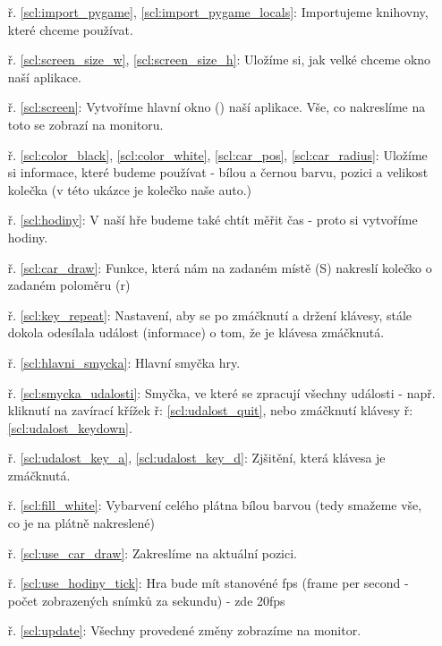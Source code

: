 \begin{minipage}[t]{.45\textwidth}
\begin{enumerate}
\item[ř. \ref{scl:import_pygame}, \ref{scl:import_pygame_locals}:] Importujeme knihovny, které chceme používat.
\item[ř. \ref{scl:screen_size_w}, \ref{scl:screen_size_h}:] Uložíme si, jak velké chceme okno naší aplikace.
\vspace{1.5cm}
\item[ř. \ref{scl:screen}:] Vytvoříme hlavní okno () naší aplikace. Vše, co nakreslíme na toto  se zobrazí na monitoru.
\item[ř. \ref{scl:color_black}, \ref{scl:color_white}, \ref{scl:car_pos}, \ref{scl:car_radius}:] Uložíme si informace, které budeme používat - bílou a černou barvu, pozici a velikost kolečka (v této ukázce je kolečko naše auto.)
\item[ř. \ref{scl:hodiny}:] V naší hře budeme také chtít měřit čas - proto si vytvoříme hodiny.
\vspace{1.8cm}
\item[ř. \ref{scl:car_draw}:] Funkce, která nám na zadaném místě (S) nakreslí kolečko o zadaném poloměru (r)
\item[ř. \ref{scl:key_repeat}:] Nastavení, aby se po zmáčknutí a držení klávesy, stále dokola odesílala událost (informace) o tom, že je klávesa zmáčknutá.
\vspace{1.5cm}
\item[ř. \ref{scl:hlavni_smycka}:] Hlavní smyčka hry.
\item[ř. \ref{scl:smycka_udalosti}:] Smyčka, ve které se zpracují všechny události - např. kliknutí na zavírací křížek ř: \ref{scl:udalost_quit}, nebo zmáčknutí klávesy ř: \ref{scl:udalost_keydown}.
\item[ř. \ref{scl:udalost_key_a}, \ref{scl:udalost_key_d}:] Zjšitění, která klávesa je zmáčknutá.
\item[ř. \ref{scl:fill_white}:] Vybarvení celého plátna bílou barvou (tedy smažeme vše, co je na plátně nakreslené)
\item[ř. \ref{scl:use_car_draw}:] Zakreslíme  na aktuální pozici.
\item[ř. \ref{scl:use_hodiny_tick}:] Hra bude mít stanovéné fps (frame per second - počet zobrazených snímků za sekundu) - zde 20fps
\item[ř. \ref{scl:update}:] Všechny provedené změny zobrazíme na monitor.
\end{enumerate}
\end{minipage}

